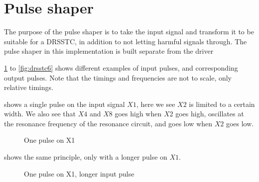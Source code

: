 
\newpage
\section{Pulse shaper}
The purpose of the pulse shaper is to take the input signal and transform it to be suitable for a DRSSTC, in addition to not letting harmful signals through. The pulse shaper in this implementation is built separate from the driver

\cref{fig:drsstc1} to \cref{fig:drsstc6} shows different examples of input pulses, and corresponding output pulses. Note that the timings and frequencies are not to scale, only relative timings.

 shows a single pulse on the input signal $X1$, here we see $X2$ is limited to a certain width. We also see that $X4$ and $X8$ goes high when $X2$ goes high, oscillates at the resonance frequency of the resonance circuit, and goes low when $X2$ goes low.

\begin{figure}[!ht]
    \centering
    \caption{One pulse on X1}
    \label{fig:drsstc1}
\end{figure}{}

 shows the same principle, only with a longer pulse on $X1$.

\begin{figure}[!ht]
    \centering
    \caption{One pulse on X1, longer input pulse}
    \label{fig:drsstc2}
\end{figure}{}

